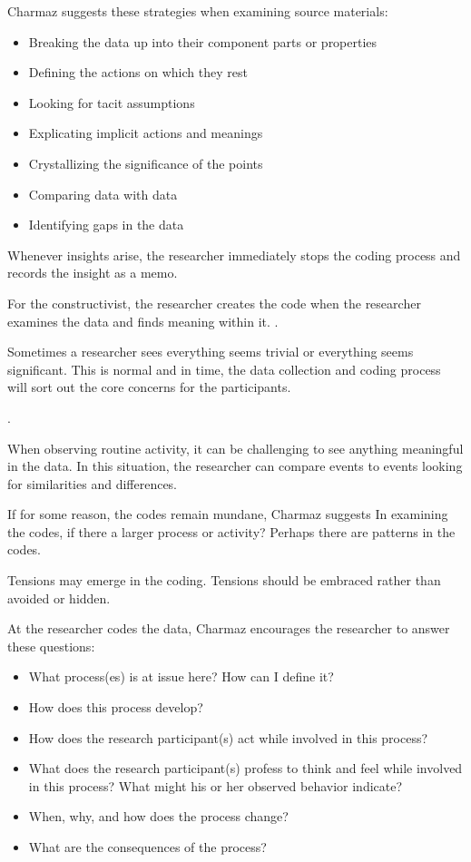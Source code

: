 Charmaz suggests these strategies when examining source materials:
\begin{itemize}
\item Breaking the data up into their component parts or properties
\item Defining the actions on which they rest
\item Looking for tacit assumptions
\item Explicating implicit actions and meanings
\item Crystallizing the significance of the points
\item Comparing data with data
\item Identifying gaps in the data \cite{Charmaz}
\end{itemize}

Whenever insights arise, the researcher immediately stops the coding process and records the insight as a memo.

For the constructivist, the researcher creates the code when the researcher examines the data and finds meaning within it.  \cite{Charmaz}.

Sometimes a researcher sees everything seems trivial or everything seems significant. This is normal and in time, the data collection and coding process will sort out the core concerns for the participants.

 \cite{Charmaz}.

When observing routine activity, it can be challenging to see anything meaningful in the data. In this situation, the researcher can compare events to events looking for similarities and differences. 

If for some reason, the codes remain mundane, Charmaz suggests  In examining the codes, if there a larger process or activity? Perhaps there are patterns in the codes. 

Tensions may emerge in the coding. Tensions should be embraced rather than avoided or hidden. 

At the researcher codes the data, Charmaz encourages the researcher to answer these questions:
\begin{itemize}
\item What process(es) is at issue here? How can I define it?
\item How does this process develop?
\item How does the research participant(s) act while involved in this process?
\item What does the research participant(s) profess to think and feel while involved in this process? What might his or her observed behavior indicate?
\item When, why, and how does the process change?
\item What are the consequences of the process? \cite{Charmaz}
\end{itemize}

